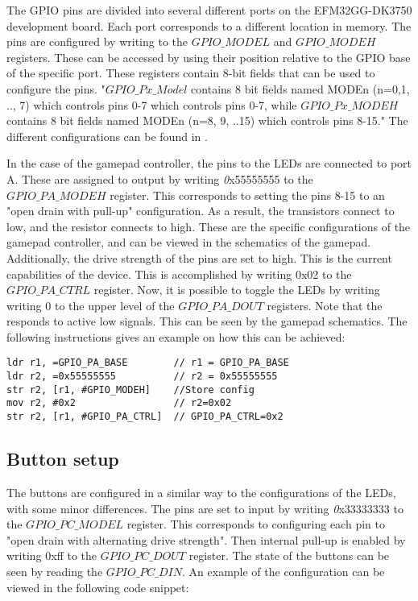 The GPIO pins are divided into several different ports on the EFM32GG-DK3750 development board. Each port corresponds to a different location in memory.  The pins are configured by writing to the $GPIO\_MODEL$ and $GPIO\_MODEH$ registers. These can be accessed by using their position relative to the GPIO base of the specific port. These registers contain 8-bit fields that can be used to configure the pins.  "$GPIO\_Px\_Model$ contains 8 bit fields named MODEn (n=0,1, .., 7) which controls pins 0-7 which controls pins 0-7, while $GPIO\_Px\_MODEH$ contains 8 bit fields named MODEn (n=8, 9, ..15) which controls pins 8-15." The different configurations can be found in \cite[p.758-759]{EFM32GG-rm}.    

In the case of the gamepad controller, the pins to the LEDs are connected to port A. These are assigned to output by writing {\emph 0x55555555} to  the $GPIO\_PA\_MODEH$ register. This corresponds to setting the pins 8-15 to an "open drain with pull-up" configuration\cite[p.758-759]{EFM32GG-rm}. As a result, the transistors connect to low, and the resistor connects to high. These are the specific configurations of the gamepad controller, and can be viewed in the schematics of the gamepad\cite{compendium}. Additionally, the drive strength of the pins are set to high. This is the current capabilities of the device. This is accomplished by writing 0x02 to the $GPIO\_PA\_CTRL$ register. Now, it is possible to toggle the LEDs by writing writing 0 to the upper level of the $GPIO\_PA\_DOUT$ registers. Note that the responds to active low signals. This can be seen by the gamepad schematics\cite{compendium}. The following instructions gives an example on how this can be achieved:


\begin{lstlisting}
ldr r1, =GPIO_PA_BASE        // r1 = GPIO_PA_BASE
ldr r2, =0x55555555          // r2 = 0x55555555  
str r2, [r1, #GPIO_MODEH]    //Store config
mov r2, #0x2                 // r2=0x02
str r2, [r1, #GPIO_PA_CTRL]  // GPIO_PA_CTRL=0x2                    

\end{lstlisting}


 

\subsection{Button setup}\label{ch:buttons}
The buttons are configured in a similar way to the configurations of the LEDs, with some minor differences. The pins are set to input by writing {\emph 0x33333333} to the $GPIO\_PC\_MODEL$ register. This corresponds to configuring each pin to "open drain with alternating drive strength"\cite[p.758-759]{EFM32GG-rm}. Then internal pull-up is enabled by writing 0xff to the $GPIO\_PC\_DOUT$ register. The state of the buttons can be seen by reading the $GPIO\_PC\_DIN$. An example of the configuration can be viewed in the following code snippet: 

